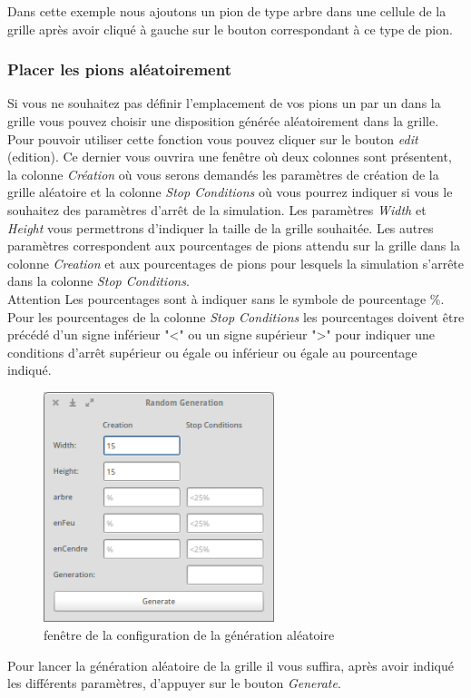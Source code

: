\documentclass[pdftex,12pt,a4paper]{article}
\begin{document}
      	\FloatBarrier
        
     Dans cette exemple nous ajoutons un pion de type arbre dans une cellule de la grille après avoir cliqué à gauche sur le bouton correspondant à ce type de pion.
    	\newpage
 		\subsubsection{Placer les pions aléatoirement}
        
     Si vous ne souhaitez pas définir  l'emplacement de vos pions un par un dans la grille vous pouvez choisir une disposition générée aléatoirement dans la grille.
     Pour pouvoir utiliser cette fonction  vous pouvez cliquer sur le bouton \emph{edit} (edition). Ce dernier vous ouvrira une fenêtre où deux colonnes sont présentent, la colonne \emph{Création} où vous serons demandés les paramètres de création de la grille aléatoire et la colonne \emph{Stop Conditions} où vous pourrez indiquer si vous le souhaitez des paramètres d'arrêt de la simulation.
     Les paramètres \emph{Width} et \emph{Height} vous permettrons d'indiquer la taille de la grille souhaitée.
     Les autres paramètres correspondent aux pourcentages de pions attendu sur la grille dans la colonne \emph{Creation} et aux pourcentages de pions pour lesquels la simulation s'arrête dans la colonne \emph{Stop Conditions}.\\
     
    Attention Les pourcentages sont à indiquer sans le symbole de pourcentage \%. Pour les pourcentages de la colonne \emph{Stop Conditions} les pourcentages doivent être précédé d'un signe inférieur  "\textless" ou un signe supérieur "\textgreater" pour indiquer une conditions d'arrêt supérieur ou égale ou inférieur ou égale au pourcentage indiqué. 
    
     	\begin{figure}[htb]
        	\begin{center}
        	\includegraphics[width=0.6\textwidth]{./images/randomWindow.png}\caption{\label{fig:randomWindow} fenêtre de la configuration de la génération aléatoire}
             \end{center}
      	\end{figure}
        \FloatBarrier
  Pour lancer la génération aléatoire de la grille il vous suffira, après avoir indiqué les différents paramètres, d'appuyer sur le bouton \emph{Generate}.
        \newpage
\end{document}
